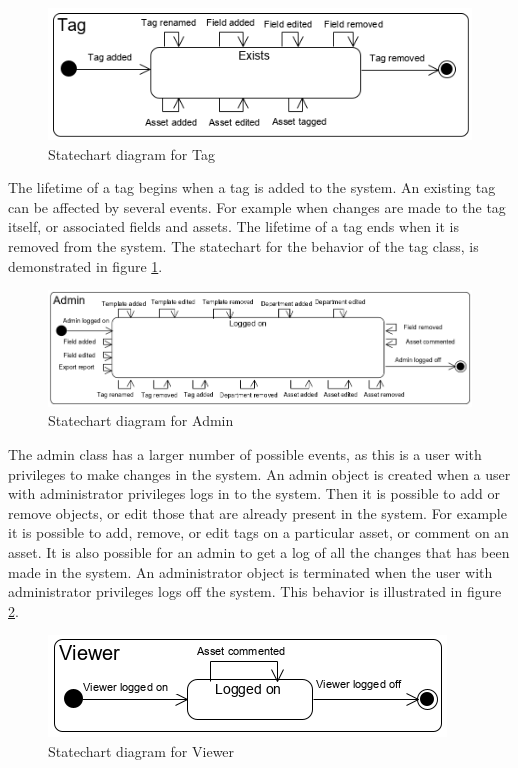 \begin{figure}[H]
    \centering
    \includegraphics{figures/Tag_statechart.png}
    \caption{Statechart diagram for Tag}
    \label{fig:tag_statechart}
\end{figure}

The lifetime of a tag begins when a tag is added to the system. An existing tag can be affected by several events. For example when changes are made to the tag itself, or associated fields and assets. The lifetime of a tag ends when it is removed from the system. The statechart for the behavior of the tag class, is demonstrated in figure \ref{fig:tag_statechart}.

\begin{figure}[H]
    \centering
    \includegraphics[width=14cm]{figures/Admin_statechart.png}
    \caption{Statechart diagram for Admin}
    \label{fig:admin_statechart}
\end{figure}

The admin class has a larger number of possible events, as this is a user with privileges to make changes in the system. An admin object is created when a user with administrator privileges logs in to the system. Then it is possible to add or remove objects, or edit those that are already present in the system. For example it is possible to add, remove, or edit tags on a particular asset, or comment on an asset. It is also possible for an admin to get a log of all the changes that has been made in the system. An administrator object is terminated when the user with administrator privileges logs off the system. This behavior is illustrated in figure \ref{fig:admin_statechart}.

\begin{figure}[H]
    \centering
    \includegraphics{figures/Viewer_statechart.png}
    \caption{Statechart diagram for Viewer}
    \label{fig:viewer_statechart}
\end{figure}

